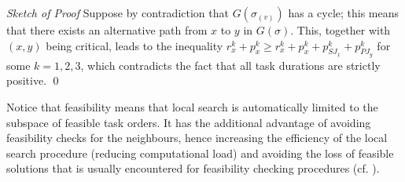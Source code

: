 \documentclass[letterpaper]{article}
\begin{document}
\emph{Sketch of Proof} Suppose by contradiction that $G(\sigma_{(v)})$ has a cycle; this means that there exists an alternative path from $x$ to $y$ in $G(\sigma)$. This, together with $(x,y)$ being critical, leads to the inequality $r_x^k + p_x^k \geq r_x^k + p_x^k + p_{SJ_x}^k + p_{PJ_y}^k$ for some $k=1,2,3$, which contradicts the fact that all task durations are strictly positive. \qed

Notice that feasibility means that local search is automatically limited to the subspace of feasible task orders. It has the additional advantage of avoiding feasibility checks for the neighbours, hence increasing the efficiency of the local search procedure (reducing computational load) and avoiding the loss of feasible solutions that is usually encountered for feasibility checking procedures (cf. \cite{DellAmico1993}).

\end{document}
